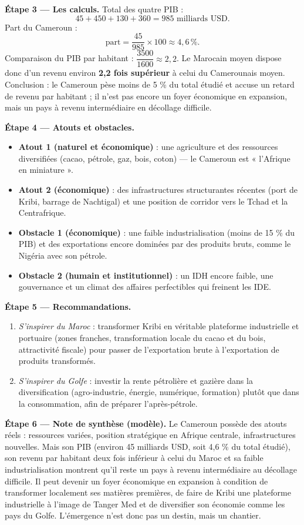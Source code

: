 \documentclass[11pt]{article}
\newcommand{\cle}[1]{{\popxbold\color{popdark}#1}}
\begin{document}
\begin{exoresolu}
\textbf{Étape 3 — Les calculs.} Total des quatre PIB :
\[ 45 + 450 + 130 + 360 = 985 \text{ milliards USD.} \]
Part du Cameroun :
\[ \text{part} = \frac{45}{985} \times 100 \approx 4,6\,\%. \]
Comparaison du PIB par habitant : $\dfrac{3500}{1600} \approx 2,2$. Le Marocain moyen dispose donc d'un revenu environ \textbf{2,2 fois supérieur} à celui du Camerounais moyen. Conclusion : le Cameroun pèse moins de 5 \% du total étudié et accuse un retard de revenu par habitant ; il n'est pas encore un foyer économique en expansion, mais un \cle{pays à revenu intermédiaire} en décollage difficile.

\textbf{Étape 4 — Atouts et obstacles.}
\begin{itemize}
\item \textbf{Atout 1 (naturel et économique)} : une agriculture et des ressources diversifiées (cacao, pétrole, gaz, bois, coton) — le Cameroun est « l'Afrique en miniature ».
\item \textbf{Atout 2 (économique)} : des infrastructures structurantes récentes (port de Kribi, barrage de Nachtigal) et une position de corridor vers le Tchad et la Centrafrique.
\item \textbf{Obstacle 1 (économique)} : une faible industrialisation (moins de 15 \% du PIB) et des exportations encore dominées par des produits bruts, comme le Nigéria avec son pétrole.
\item \textbf{Obstacle 2 (humain et institutionnel)} : un IDH encore faible, une gouvernance et un climat des affaires perfectibles qui freinent les IDE.
\end{itemize}

\textbf{Étape 5 — Recommandations.}
\begin{enumerate}
\item \emph{S'inspirer du Maroc} : transformer Kribi en véritable plateforme industrielle et portuaire (zones franches, transformation locale du cacao et du bois, attractivité fiscale) pour passer de l'exportation brute à l'exportation de produits transformés.
\item \emph{S'inspirer du Golfe} : investir la rente pétrolière et gazière dans la diversification (agro-industrie, énergie, numérique, formation) plutôt que dans la consommation, afin de préparer l'après-pétrole.
\end{enumerate}

\textbf{Étape 6 — Note de synthèse (modèle).} Le Cameroun possède des atouts réels : ressources variées, position stratégique en Afrique centrale, infrastructures nouvelles. Mais son PIB (environ 45 milliards USD, soit 4,6 \% du total étudié), son revenu par habitant deux fois inférieur à celui du Maroc et sa faible industrialisation montrent qu'il reste un pays à revenu intermédiaire au décollage difficile. Il peut devenir un foyer économique en expansion à condition de transformer localement ses matières premières, de faire de Kribi une plateforme industrielle à l'image de Tanger Med et de diversifier son économie comme les pays du Golfe. L'émergence n'est donc pas un destin, mais un chantier.
\end{exoresolu}
\end{document}
